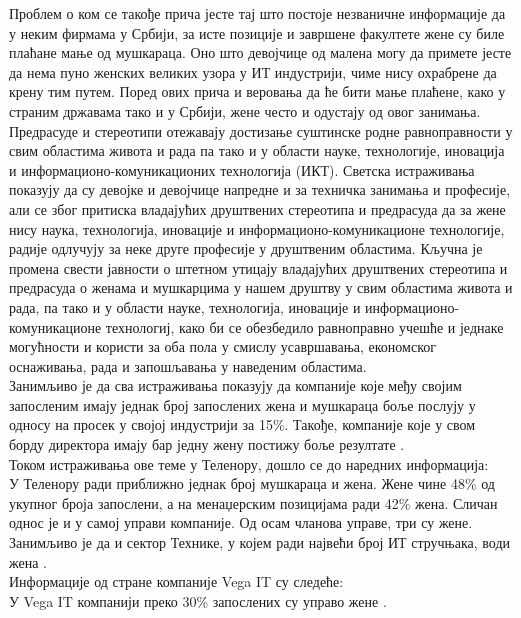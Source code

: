 \documentclass[a4paper]{article}
\begin{document}
Проблем о ком се такође прича јесте тај што постоје незваничне информације да у неким фирмама у 
Србији, за исте позиције и завршене факултете жене су биле плаћане мање од мушкараца. Оно што 
девојчице од малена могу да примете јесте да нема пуно женских великих узора у ИТ индустрији, чиме
нису охрабрене да крену тим путем. Поред ових прича и веровања да ће бити мање плаћене, како у 
страним државама тако и у Србији, жене често и одустају од овог занимања. \\
Предрасуде и стереотипи отежавају достизање суштинске родне равноправности у
свим областима живота и рада па тако и у области науке, технологије, иновација
и информационо-комуникационих технологија (ИКТ). Светска истраживања показују
да су девојке и девојчице напредне и за техничка занимања и професије, али
се због притиска владајућих друштвених стереотипа и предрасуда да за жене
нису наука, технологија, иновације и информационо-комуникационе технологије,
радије одлучују за неке друге професије у друштвеним областима. Кључна је
промена свести јавности о штетном утицају владајућих друштвених стереотипа и
предрасуда о женама и мушкарцима у нашем друштву у свим областима живота
и рада, па тако и у области науке, технологија, иновације и информационо-комуникационе технологиј,
како би се обезбедило равноправно учешће и једнаке могућности и користи за оба пола у смислу 
усавршавања, економског оснаживања, рада и запошљавања у наведеним областима. \\
Занимљиво је да сва истраживања показују да компаније које међу својим запосленим имају једнак 
број запослених жена и мушкараца боље послују у односу на просек у својој индустрији за 15\%. 
Такође, компаније које у свом борду директора имају бар једну жену постижу боље резултате 
\cite{eu_it_sektor}.\\

Током истраживања ове теме у Теленору, дошло се до наредних информација:\\
У Теленору ради приближно једнак број мушкараца и жена. Жене чине 48\% од укупног броја запослени,
а на менаџерским позицијама ради 42\% жена. Сличан однос је и у самој управи компаније. Од осам 
чланова управе, три су жене. Занимљиво је да и сектор Технике, у којем ради највећи број ИТ 
стручњака, води жена \cite{telenor_it}.\\
Информације од стране компаније Vega IT су следеће:\\
У Vega IT компанији преко 30\% запослених су управо жене \cite{vega_it}.\\
\end{document}
